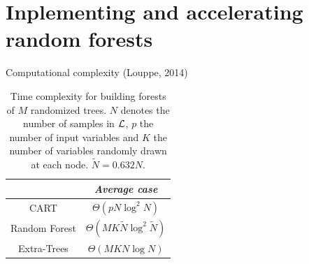 \documentclass{beamer}
\begin{document}

\section{Inplementing and accelerating random forests}

\begin{frame}{Computational complexity {\scriptsize (Louppe, 2014)}}

\begin{table}
    \centering
    \begin{tabular}{| c | c |}
    \hline
         & \textit{Average case}  \\
    \hline
    \hline
    CART & $\Theta(pN\log^2 N)$ \\
    Random Forest & $\Theta(MK\widetilde{N}\log^2 \widetilde{N})$  \\
    Extra-Trees & $\Theta(MKN\log N)$  \\
    \hline
    \end{tabular}
    \caption{Time complexity for building forests of $M$ randomized trees. $N$ denotes the number of samples in ${\cal L}$, $p$ the number of input variables and $K$ the number of variables randomly drawn at each node. $\widetilde{N} = 0.632 N$.}
    \label{table:complexity-fit}
\end{table}

\end{frame}
\end{document}
